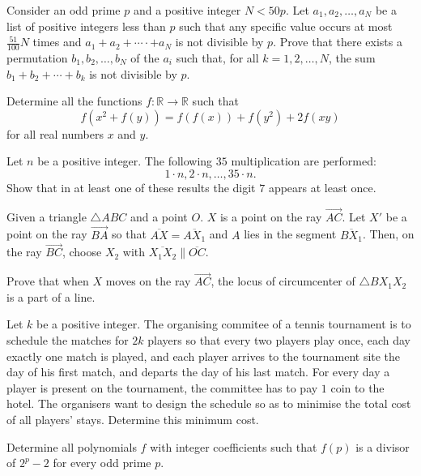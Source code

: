 \documentclass[11pt]{scrartcl}
\begin{document}
\begin{problem}[718838419070287]
Consider an odd prime $p$ and a positive integer $N < 50p$. Let $a_1, a_2, \ldots , a_N$ be a list of positive integers less than $p$ such that any specific value occurs at most $\frac{51}{100}N$ times and $a_1 + a_2 + \cdots· + a_N$ is not divisible by $p$. Prove that there exists a permutation $b_1, b_2, \ldots , b_N$ of the $a_i$ such that, for all $k = 1, 2, \ldots , N$, the sum $b_1 + b_2 + \cdots + b_k$ is not divisible by $p$.
\end{problem}
\begin{problem}[3104172479883832933]
	Determine all the functions $f : \mathbb{R} \to \mathbb{R}$ such that
\[ f(x^2 + f(y)) = f(f(x)) + f(y^2) + 2f(xy) \]for all real numbers $x$ and $y$.
\end{problem}
\begin{problem}[7284124089748055531]
Let $n$ be a positive integer. The following $35$ multiplication are performed:
$$1 \cdot n, 2 \cdot n, \dots, 35 \cdot n.$$Show that in at least one of these results the digit $7$ appears at least once.
\end{problem}
\begin{problem}[1790114062253914451]
	Given a triangle $ \triangle{ABC} $ and a point $ O $. $ X $ is a point on the ray $ \overrightarrow{AC} $. Let $ X' $ be a point on the ray $ \overrightarrow{BA} $ so that $ \overline{AX} = \overline{AX_{1}} $ and $ A $ lies in the segment $ \overline{BX_{1}} $. Then, on the ray $ \overrightarrow{BC} $, choose $ X_{2} $ with $ \overline{X_{1}X_{2}} \parallel \overline{OC} $.

Prove that when $ X $ moves on the ray $ \overrightarrow{AC} $, the locus of circumcenter of $ \triangle{BX_{1}X_{2}} $ is a part of a line.
\end{problem}
\begin{problem}[8916142707013964275]
	Let $k$ be a positive integer. The organising commitee of a tennis tournament is to schedule the matches for $2k$ players so that every two players play once, each day exactly one match is played, and each player arrives to the tournament site the day of his first match, and departs the day of his last match. For every day a player is present on the tournament, the committee has to pay $1$ coin to the hotel. The organisers want to design the schedule so as to minimise the total cost of all players' stays. Determine this minimum cost.
\end{problem}
\begin{problem}[3753289685429929419]
Determine all polynomials $f$ with integer coefficients such that $f(p)$ is a divisor of $2^p-2$ for every odd prime $p$.
\end{problem}
\end{document}
